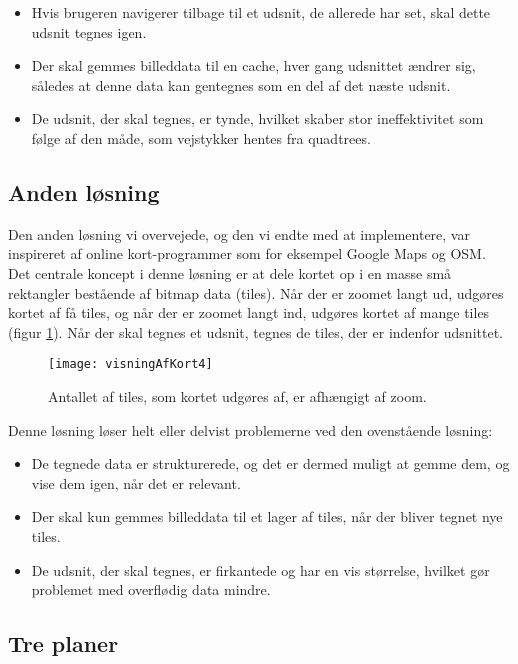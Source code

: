 \begin{itemize}
	\item Hvis brugeren navigerer tilbage til et udsnit, de allerede har set, skal dette udsnit tegnes igen.
	\item Der skal gemmes billeddata til en cache, hver gang udsnittet ændrer sig, således at denne data kan gentegnes som en del af det næste udsnit.
	\item De udsnit, der skal tegnes, er tynde, hvilket skaber stor ineffektivitet som følge af den måde, som vejstykker hentes fra quadtrees.
\end{itemize}

\subsection{Anden løsning}
\label{subsec:andenLoesning}

Den anden løsning vi overvejede, og den vi endte med at implementere, var inspireret af online kort-programmer som for eksempel Google Maps og OSM. Det centrale koncept i denne løsning er at dele kortet op i en masse små rektangler bestående af bitmap data (tiles). Når der er zoomet langt ud, udgøres kortet af få tiles, og når der er zoomet langt ind, udgøres kortet af mange tiles (figur \ref{figur:visningAfKort4}). Når der skal tegnes et udsnit, tegnes de tiles, der er indenfor udsnittet.

\begin{figure}[h]
	\centering
	\texttt{[image: visningAfKort4]}
	\captionsetup{width=0.8\textwidth}
	\caption{Antallet af tiles, som kortet udgøres af, er afhængigt af zoom.}
	\label{figur:visningAfKort4}
\end{figure}

Denne løsning løser helt eller delvist problemerne ved den ovenstående løsning:

\begin{itemize}
	\item De tegnede data er strukturerede, og det er dermed muligt at gemme dem, og vise dem igen, når det er relevant.
	\item Der skal kun gemmes billeddata til et lager af tiles, når der bliver tegnet nye tiles.
	\item De udsnit, der skal tegnes, er firkantede og har en vis størrelse, hvilket gør problemet med overflødig data mindre.
\end{itemize}

\subsection{Tre planer}
\label{subsec:trePlaner}

